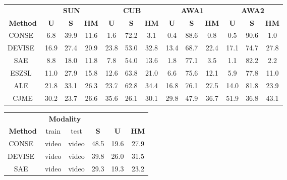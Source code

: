 \begin{table*}
\centering
\begin{minipage}[b]{0.66\textwidth}
\resizebox{\textwidth}{!} {
\renewcommand{\arraystretch}{1.25}
\begin{tabular}{c|ccc|ccc|ccc|ccc}
\hline
& \multicolumn{3}{c|}{\textbf{SUN}} & \multicolumn{3}{c|}{\textbf{CUB}} & \multicolumn{3}{c|}{\textbf{AWA1}}& \multicolumn{3}{c}{\textbf{AWA2}} \\
\textbf{Method} & \textbf{U} & \textbf{S} & \textbf{HM} & \textbf{U} & \textbf{S} & \textbf{HM} & \textbf{U} & \textbf{S} & \textbf{HM} & \textbf{U} & \textbf{S} & \textbf{HM}  \\ \hline \hline
CONSE~\cite{norouzi2013zero} & 6.8 & 39.9 & 11.6 & 1.6 & 72.2 & 3.1 & 0.4 &88.6 &0.8 & 0.5 & 90.6 & 1.0 \\
DEVISE~\cite{frome2013devise} & 16.9 & 27.4 & 20.9 & 23.8 & 53.0 & 32.8 & 13.4 &68.7 &22.4 & 17.1 & 74.7 & 27.8  \\
SAE~\cite{kodirov2017semantic} & 8.8 & 18.0 & 11.8 & 7.8 & 54.0 & 13.6 & 1.8 &77.1 &3.5 & 1.1 & 82.2 & 2.2 \\
ESZSL~\cite{romera2015embarrassingly} & 11.0 & 27.9 & 15.8 & 12.6 & 63.8 & 21.0 &6.6&75.6&12.1& 5.9 & 77.8 & 11.0 \\
ALE~\cite{akata2016label} & 21.8 & 33.1 & 26.3 & 23.7 & 62.8 & {34.4} & 16.8 & 76.1 & 27.5 & 14.0 & 81.8 & 23.9 \\ 
\hline
CJME & 30.2 &23.7 & {26.6} & 35.6 & 26.1 & 30.1 &   29.8& 47.9 & {36.7} &51.9 &36.8 & {43.1} \\
\hline
\end{tabular}
}
\caption{Comparison with existing methods on standard datasets (projection based methods only, see sec.~\ref{sec:sota} for details)}
\label{tab:zsl_otherdata}
\end{minipage}
\hfill
\begin{minipage}[b]{.32\textwidth}
\resizebox{\textwidth}{!} {
\begin{tabular}{c|cc|ccc}
\hline
&\multicolumn{2}{c|}{\textbf{Modality}}&&&\\
\textbf{Method}& train & test   &\textbf{S} & \textbf{U} & \textbf{HM} \\
\hline \hline 
CONSE~\cite{norouzi2013zero}  & video & video &48.5 & 19.6 & 27.9  \\
DEVISE~\cite{frome2013devise} & video & video &39.8 & 26.0 & 31.5  \\
SAE~\cite{kodirov2017semantic}  & video & video &29.3 & 19.3 & 23.2 \\

\end{tabular}}
\end{minipage}
\end{table*}
